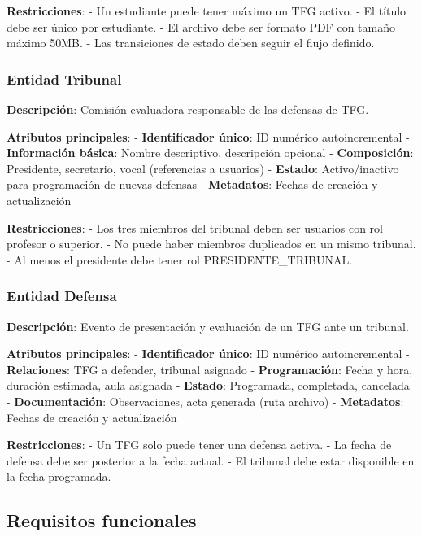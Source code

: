 \documentclass[12pt,a4paper,oneside]{report}
\begin{document}
\textbf{Restricciones}: - Un estudiante puede tener máximo un TFG
activo. - El título debe ser único por estudiante. - El archivo debe ser
formato PDF con tamaño máximo 50MB. - Las transiciones de estado deben
seguir el flujo definido.

\subsubsection{Entidad Tribunal}\label{entidad-tribunal}

\textbf{Descripción}: Comisión evaluadora responsable de las defensas de
TFG.

\textbf{Atributos principales}: - \textbf{Identificador único}: ID
numérico autoincremental - \textbf{Información básica}: Nombre
descriptivo, descripción opcional - \textbf{Composición}: Presidente,
secretario, vocal (referencias a usuarios) - \textbf{Estado}:
Activo/inactivo para programación de nuevas defensas -
\textbf{Metadatos}: Fechas de creación y actualización

\textbf{Restricciones}: - Los tres miembros del tribunal deben ser
usuarios con rol profesor o superior. - No puede haber miembros
duplicados en un mismo tribunal. - Al menos el presidente debe tener rol
PRESIDENTE\_TRIBUNAL.

\subsubsection{Entidad Defensa}\label{entidad-defensa}

\textbf{Descripción}: Evento de presentación y evaluación de un TFG ante
un tribunal.

\textbf{Atributos principales}: - \textbf{Identificador único}: ID
numérico autoincremental - \textbf{Relaciones}: TFG a defender, tribunal
asignado - \textbf{Programación}: Fecha y hora, duración estimada, aula
asignada - \textbf{Estado}: Programada, completada, cancelada -
\textbf{Documentación}: Observaciones, acta generada (ruta archivo) -
\textbf{Metadatos}: Fechas de creación y actualización

\textbf{Restricciones}: - Un TFG solo puede tener una defensa activa. -
La fecha de defensa debe ser posterior a la fecha actual. - El tribunal
debe estar disponible en la fecha programada.

\subsection{Requisitos funcionales}\label{requisitos-funcionales}
\end{document}
